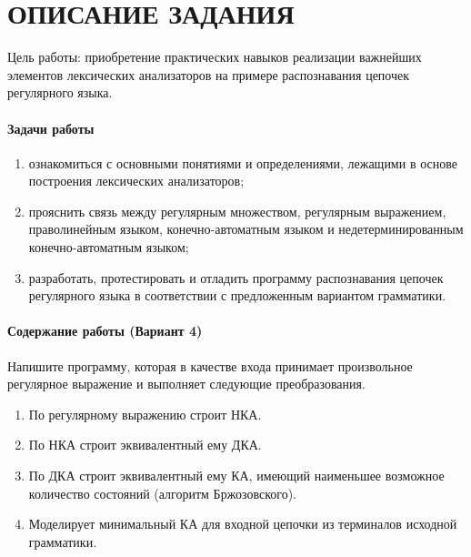 \chapter*{ОПИСАНИЕ ЗАДАНИЯ}

Цель работы: приобретение практических навыков реализации важнейших
элементов лексических анализаторов на примере распознавания цепочек
регулярного языка.

\subsubsection*{Задачи работы}
\begin{enumerate}[label=\arabic*)]
	\item ознакомиться с основными понятиями и определениями, лежащими в
	основе построения лексических анализаторов;
	\item прояснить связь между регулярным множеством, регулярным
	выражением, праволинейным языком, конечно-автоматным языком и
	недетерминированным конечно-автоматным языком;
	\item разработать, протестировать и отладить программу распознавания цепочек
	регулярного языка в соответствии с предложенным вариантом
	грамматики.
\end{enumerate}

\subsubsection*{Содержание работы (Вариант 4)}

Напишите программу, которая в качестве входа принимает произвольное
регулярное выражение и выполняет следующие преобразования.

\begin{enumerate}[label=\arabic*)]
	\item По регулярному выражению строит НКА.
	\item По НКА строит эквивалентный ему ДКА.
	\item По ДКА строит эквивалентный ему КА, имеющий наименьшее
	возможное количество состояний (алгоритм Бржозовского).
	\item Моделирует минимальный КА для входной цепочки из терминалов
	исходной грамматики.
\end{enumerate}